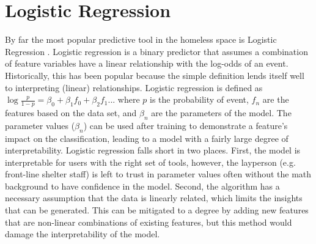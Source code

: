 \section{Logistic Regression} \label{chap:rl:lr}
By far the most popular predictive tool in the homeless space is Logistic Regression \cite{hastie2009elements} \cite{king2001LogisticR} \cite{allegheny2019homeless} \cite{hong2018applications} \cite{toros2019early}. Logistic regression is a binary predictor that assumes a combination of feature variables have a linear relationship with the log-odds of an event. Historically, this has been popular because the simple definition lends itself well to interpreting (linear) relationships. Logistic regression is defined as $\log \frac {p}{1-p} = \beta_0 + \beta_1 f_0 + \beta_2 f_1 ...$ where $p$ is the probability of event, $f_n$ are the features based on the data set, and $\beta_n$ are the parameters of the model. The parameter values ($\beta_n$) can be used after training to demonstrate a feature's impact on the classification, leading to a model with a fairly large degree of interpretability.
Logistic regression falls short in two places. First, the model is interpretable for users with the right set of tools, however, the layperson (e.g. front-line shelter staff) is left to trust in parameter values often without the math background to have confidence in the model. Second, the algorithm has a necessary assumption that the data is linearly related, which limits the insights that can be generated. This can be mitigated to a degree by adding new features that are non-linear combinations of existing features, but this method would damage the  interpretability of the model.



